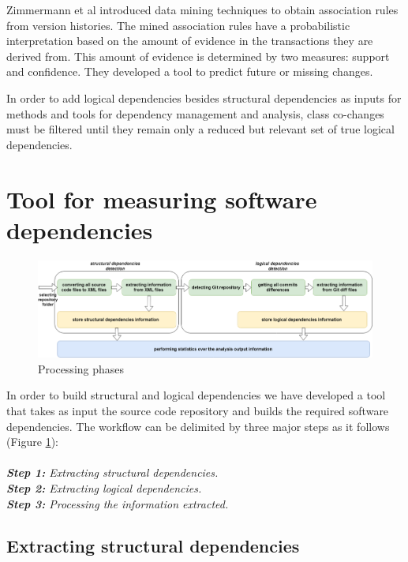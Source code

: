 \documentclass[conference]{IEEEtran}
\begin{document}
Zimmermann et al \cite{Zimmermann:2004:MVH:998675.999460} introduced data mining techniques to obtain association
rules from version histories.
The mined association rules  have a probabilistic interpretation based on the amount of
evidence in the transactions they are derived from. This
amount of evidence is determined by two measures: 
support and confidence.  They developed a tool to predict future or
missing changes.



In order to add logical dependencies besides structural dependencies as inputs for methods and tools for dependency management and analysis, class co-changes must be filtered until they remain only a reduced but relevant set of true logical dependencies. 


\section{Tool for measuring software dependencies}
\label{sec:tool}



\begin{figure}[htb]
\centering
\includegraphics[width=\textwidth]{fig3.png}
\caption{Processing phases}
\label{fig:fig3}
\end{figure}

In order to build structural and logical dependencies we have developed a tool that takes as input the source code repository and builds the required software dependencies. The workflow can be delimited by three major steps as it follows (Figure \ref{fig:fig3}):\\ \\
\textit{\textbf{Step 1:} Extracting structural dependencies.}\\
\textit{\textbf{Step 2:} Extracting logical dependencies.}\\
\textit{\textbf{Step 3:} Processing the information extracted.}


\subsection{ Extracting structural dependencies}
\end{document}
